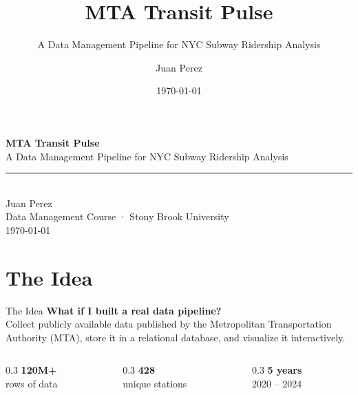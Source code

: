 \documentclass{beamer}
\title{\textbf{MTA Transit Pulse}}
\subtitle{A Data Management Pipeline for NYC Subway Ridership Analysis}
\author{Juan Perez}
\institute{Data Management Course \\ Stony Brook University}
\date{\today}
\begin{document}
	
	\begin{frame}[plain]
		\centering
		\vspace{1.5cm}
		
		{\Large\textcolor{accentBlue}{\textbf{MTA Transit Pulse}}}\\
		\vspace{0.4cm}
		{\small\textcolor{softWhite}{A Data Management Pipeline for NYC Subway Ridership Analysis}}\\
		\vspace{0.8cm}
		\textcolor{accentBlue}{\rule{0.6\textwidth}{0.4pt}}\\
		\vspace{0.6cm}
		{\small\textcolor{softWhite}{Juan Perez}}\\
		\vspace{0.1cm}
		{\scriptsize\textcolor{softWhite}{Data Management Course · Stony Brook University}}\\
		\vspace{0.1cm}
		{\scriptsize\textcolor{softWhite}{\today}}
	\end{frame}
	\section{The Idea}
	
	\begin{frame}{The Idea}
		\centering
		\Large{\textbf{What if I built a real data pipeline?}}\\
		\vspace{0.5cm}
		\normalsize
		Collect publicly available data published by the Metropolitan
		Transportation Authority (MTA), store it in a relational database,
		and visualize it interactively.\\
		\vspace{0.8cm}
		\pause
		\begin{columns}[c]
			\begin{column}{0.3\textwidth}
				\centering
				\textcolor{accentBlue}{\Large\textbf{120M+}}\\
				\small rows of data
			\end{column}
			\begin{column}{0.3\textwidth}
				\centering
				\textcolor{mtaRed}{\Large\textbf{428}}\\
				\small unique stations
			\end{column}
			\begin{column}{0.3\textwidth}
				\centering
				\textcolor{mtaGreen}{\Large\textbf{5 years}}\\
				\small 2020 -- 2024
			\end{column}
		\end{columns}
	\end{frame}
	
\end{document}
